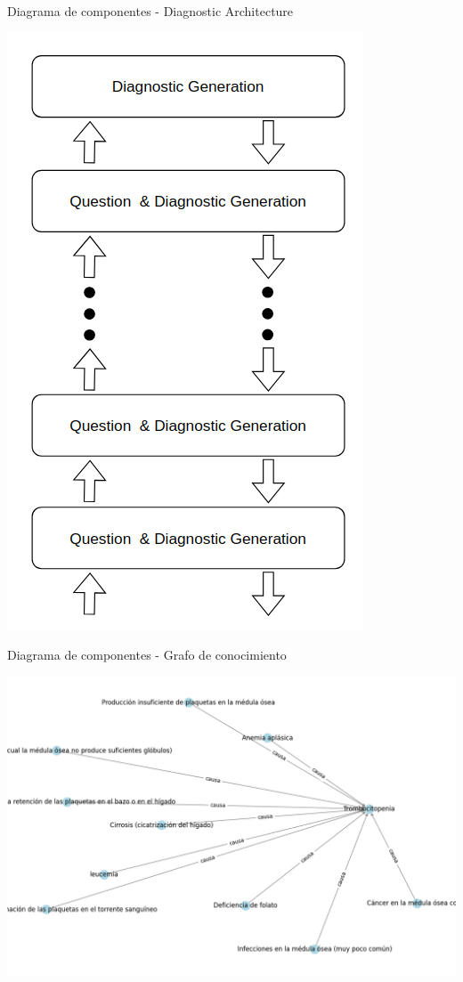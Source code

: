 \documentclass[10pt]{beamer}
\begin{document}
\begin{frame}{Diagrama de componentes - Diagnostic Architecture}
  \begin{center}
    \includegraphics[scale=0.32]{Diagnostic_Layer_Architecture.png}
  \end{center}  
\end{frame}

\begin{frame}{Diagrama de componentes - Grafo de conocimiento}
  \begin{center}
    \includegraphics[scale=0.4]{graph_example.png}
  \end{center}  
\end{frame}
\end{document}
